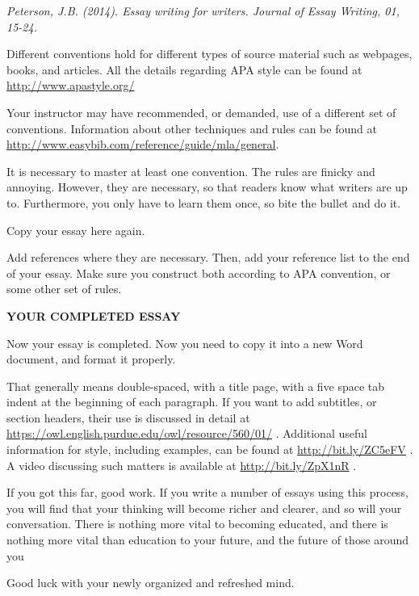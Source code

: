 \documentclass{article}
\begin{document}
\emph{Peterson, J.B. (2014). Essay writing for writers. Journal of Essay
Writing, 01, 15-24.}

Different conventions hold for different types of source material such
as webpages, books, and articles. All the details regarding APA style
can be found at \url{http://www.apastyle.org/}

Your instructor may have recommended, or demanded, use of a different
set of conventions. Information about other techniques and rules can be
found at \url{http://www.easybib.com/reference/guide/mla/general}.

It is necessary to master at least one convention. The rules are finicky
and annoying. However, they are necessary, so that readers know what
writers are up to. Furthermore, you only have to learn them once, so
bite the bullet and do it.

Copy your essay here again.

Add references where they are necessary. Then, add your reference list
to the end of your essay. Make sure you construct both according to APA
convention, or some other set of rules.

\textbf{YOUR COMPLETED ESSAY}

Now your essay is completed. Now you need to copy it into a new Word
document, and format it properly.

That generally means double-spaced, with a title page, with a five space
tab indent at the beginning of each paragraph. If you want to add
subtitles, or section headers, their use is discussed in detail at
\url{https://owl.english.purdue.edu/owl/resource/560/01/} . Additional
useful information for style, including examples, can be found at
\url{http://bit.ly/ZC5eFV} . A video discussing such matters is
available at \url{http://bit.ly/ZpX1nR} .

If you got this far, good work. If you write a number of essays using
this process, you will find that your thinking will become richer and
clearer, and so will your conversation. There is nothing more vital to
becoming educated, and there is nothing more vital than education to
your future, and the future of those around you

Good luck with your newly organized and refreshed mind.
\end{document}
